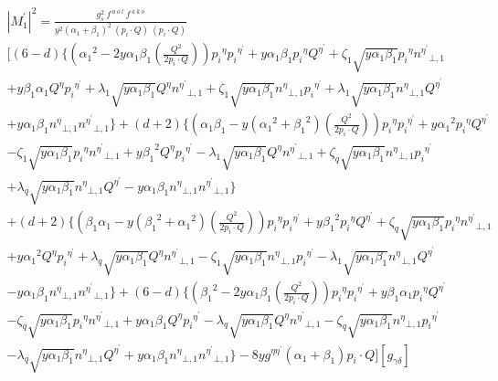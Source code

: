 \begin{equation}
\begin{split}
{|{M}^{\prime}_1|}^2 =\frac{g_s^2 \:f^{\:a\:o\:l}\: f^{\:a\:k\:o}}{y^2({\alpha_1}+\beta_1)^2\:(p_i\cdot Q) \:(p_i\cdot Q)} \\
[(6-d)\lbrace({\alpha_1}^2 -2y\alpha_1 \beta_1(\frac{Q^2}{2p_i \cdot Q})) {p_i}^{\eta}{p_i}^{{\eta}^{\prime}}+y\alpha_1\beta_1 {p_i}^{\eta}{Q}^{{\eta}^{\prime}}+\zeta_1\sqrt{y\alpha_1\beta_1}{p_i}^{\eta}{n^{{\eta}^{\prime}}}_{\bot,1}\\
+y\beta_1\alpha_1  {Q}^{\eta}{p_i}^{{\eta}^{\prime}}+\lambda_1\sqrt{y\alpha_1\beta_1}{Q}^{\eta}{n^{{\eta}^{\prime}}}_{\bot,1}
+\zeta_1\sqrt{y\alpha_1\beta_1} {n^{{\eta}}}_{\bot,1}{p_i}^{{\eta}^{\prime}}+\lambda_1\sqrt{y\alpha_1\beta_1}{n^{{\eta}}}_{\bot,1}{Q}^{{\eta}^{\prime}}\\+y\alpha_1\beta_1{n^{{\eta}}}_{\bot,1}{n^{{\eta}^{\prime}}}_{\bot,1}\rbrace
+(d+2)\lbrace(\alpha_1\beta_1-y({\alpha_1}^2+{\beta_1}^2) (\frac{Q^2}{2p_i \cdot Q})) {p_i}^{\eta}{p_i}^{{\eta}^{\prime}}+y{\alpha_1}^2{p_i}^{\eta}{Q}^{{\eta}^{\prime}}\\-\zeta_1\sqrt{y\alpha_1\beta_1}{p_i}^{\eta}{n^{{\eta}^{\prime}}}_{\bot,1}
+y{\beta_1}^2 {Q}^{\eta}{p_i}^{{\eta}^{\prime}}-\lambda_1\sqrt{y\alpha_1\beta_1}{Q}^{\eta}{n^{{\eta}^{\prime}}}_{\bot,1}
+\zeta_q\sqrt{y\alpha_1\beta_1} {n^{{\eta}}}_{\bot,1}{p_i}^{{\eta}^{\prime}}\\+\lambda_q\sqrt{y\alpha_1\beta_1}{n^{{\eta}}}_{\bot,1}{Q}^{{\eta}^{\prime}}-y\alpha_1\beta_1{n^{{\eta}}}_{\bot,1}{n^{{\eta}^{\prime}}}_{\bot,1}\rbrace\\
+(d+2)\lbrace(\beta_1\alpha_1-y({\beta_1}^2+{\alpha_1}^2)(\frac{Q^2}{2p_i \cdot Q})) {p_i}^{\eta}{p_i}^{{\eta}^{\prime}}+y{\beta_1}^2{p_i}^{\eta}{Q}^{{\eta}^{\prime}}+\zeta_q\sqrt{y\alpha_1\beta_1}{p_i}^{\eta}{n^{{\eta}^{\prime}}}_{\bot,1}\\
+y{\alpha_1}^2 {Q}^{\eta}{p_i}^{{\eta}^{\prime}}+\lambda_q\sqrt{y\alpha_1\beta_1}{Q}^{\eta}{n^{{\eta}^{\prime}}}_{\bot,1}
-\zeta_1\sqrt{y\alpha_1\beta_1} {n^{{\eta}}}_{\bot,1}{p_i}^{{\eta}^{\prime}}-\lambda_1\sqrt{y\alpha_1\beta_1}{n^{{\eta}}}_{\bot,1}{Q}^{{\eta}^{\prime}}\\-y\alpha_1\beta_1{n^{{\eta}}}_{\bot,1}{n^{{\eta}^{\prime}}}_{\bot,1}\rbrace
+(6-d)\lbrace({\beta_1}^2 -2y\alpha_1\beta_1 (\frac{Q^2}{2p_i \cdot Q})) {p_i}^{\eta}{p_i}^{{\eta}^{\prime}}+y\beta_1\alpha_1 {p_i}^{\eta}{Q}^{{\eta}^{\prime}}\\-\zeta_q\sqrt{y\alpha_1\beta_1}{p_i}^{\eta}{n^{{\eta}^{\prime}}}_{\bot,1}
+y\alpha_1\beta_1 {Q}^{\eta}{p_i}^{{\eta}^{\prime}}-\lambda_q\sqrt{y\alpha_1\beta_1}{Q}^{\eta}{n^{{\eta}^{\prime}}}_{\bot,1}
-\zeta_q\sqrt{y\alpha_1\beta_1} {n^{{\eta}}}_{\bot,1}{p_i}^{{\eta}^{\prime}}\\-\lambda_q\sqrt{y\alpha_1\beta_1}{n^{{\eta}}}_{\bot,1}{Q}^{{\eta}^{\prime}}+y\alpha_1\beta_1{n^{{\eta}}}_{\bot,1}{n^{{\eta}^{\prime}}}_{\bot,1}\rbrace-8yg^{{\eta}{{\eta}^{\prime}}}({\alpha}_1 +{\beta}_1) p_i \cdot Q][g_{{\gamma}{{\delta}}}]\\
\end{split}
\end{equation}


